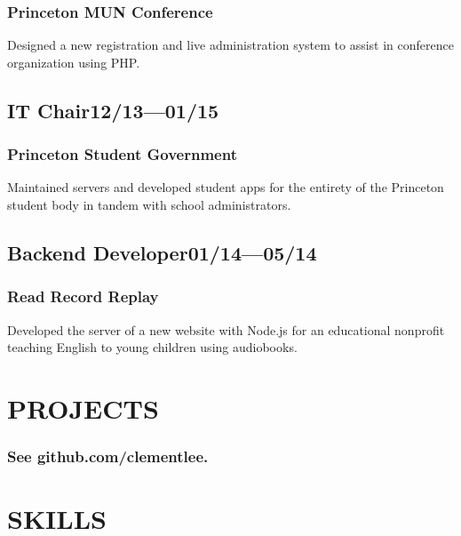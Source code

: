 \documentclass[11pt]{article}
\begin{document}
\begin{multicols}{2}
  \subsubsection*{Princeton MUN Conference}
  Designed a new registration and live administration system to assist in conference organization using PHP.

  \subsection*{IT Chair\hfill\textnormal{12/13---01/15}}
  \subsubsection*{Princeton Student Government}
  Maintained servers and developed student apps for the entirety of the Princeton student body in tandem with school administrators.

  \subsection*{Backend Developer\hfill\textnormal{01/14---05/14}}
  \subsubsection*{Read Record Replay}
  Developed the server of a new website with Node.js for an educational nonprofit teaching English to young children using audiobooks.

  \section*{PROJECTS}
  \vspace{-0.5\baselineskip}
  \subsubsection*{See github.com/clementlee.}

  \vspace{2\baselineskip}


  \section*{SKILLS}


\end{multicols}
\end{document}
